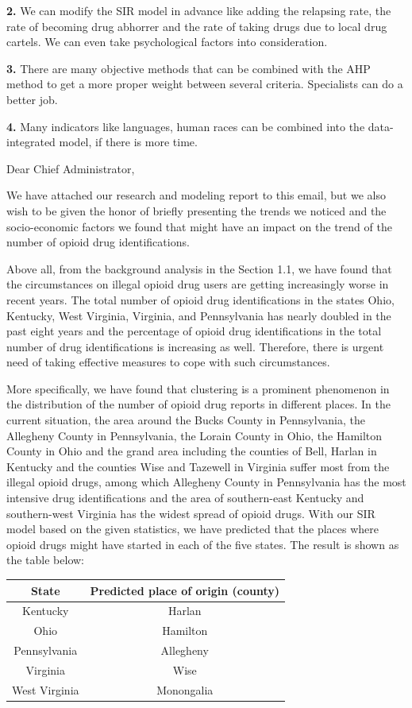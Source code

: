 \documentclass{mcmthesis}
\begin{document}
\noindent \textbf{2.} We can modify the SIR model in advance like adding the relapsing rate, the rate of becoming drug abhorrer and the rate of taking drugs due to local drug cartels. We can even take psychological factors into consideration.

\noindent \textbf{3.} There are many objective methods that can be combined with the AHP method to get a more proper weight between several criteria. Specialists can do a better job.

\noindent \textbf{4.} Many indicators like languages, human races can be combined into the data-integrated model, if there is more time.

\newpage
\noindent Dear Chief Administrator,

We have attached our research and modeling report to this email, but we also wish to be given the honor of briefly presenting the trends we noticed and the socio-economic factors we found that might have an impact on the trend of the number of opioid drug identifications.

Above all, from the background analysis in the Section 1.1, we have found that the circumstances on illegal opioid drug users are getting increasingly worse in recent years. The total number of opioid drug identifications in the states Ohio, Kentucky, West Virginia, Virginia, and Pennsylvania has nearly doubled in the past eight years and the percentage of opioid drug identifications in the total number of drug identifications is increasing as well. Therefore, there is urgent need of taking effective measures to cope with such circumstances. 

More specifically, we have found that clustering is a prominent phenomenon in the distribution of the number of opioid drug reports in different places. In the current situation, the area around the Bucks County in Pennsylvania, the Allegheny County in Pennsylvania, the Lorain County in Ohio, the Hamilton County in Ohio and the grand area including the counties of Bell, Harlan in Kentucky and the counties Wise and Tazewell in Virginia suffer most from the illegal opioid drugs, among which Allegheny County in Pennsylvania has the most intensive drug identifications and the area  of southern-east Kentucky and southern-west Virginia has the widest spread of opioid drugs.  With our SIR model based on the given statistics, we have predicted that the places where opioid drugs might have started in each of the five states. The result is shown as the table below:
\begin{table}[htbp!]
\centering
\begin{tabular}{cc}
\toprule[1.5pt]
State & Predicted place of origin (county)\\
\midrule[1pt]
Kentucky & Harlan\\
Ohio & Hamilton\\
Pennsylvania & Allegheny\\
Virginia & Wise\\
West Virginia & Monongalia\\
\bottomrule[1.5pt]
\end{tabular}
\end{table}
\end{document}
